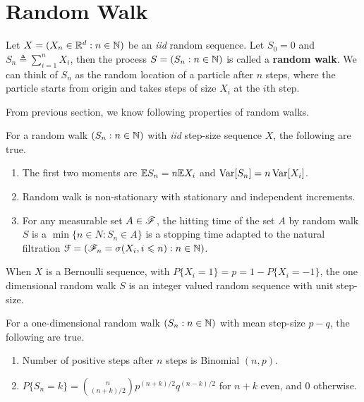 \documentclass[a4paper,10pt,english]{article}
\begin{document}
\section{Random Walk}
Let $X = (X_n \in \mathbb{R}^d: n \in \mathbb{N})$ be an \emph{iid} random sequence. 
Let $S_0 = 0$ and $S_n \triangleq \sum_{i=1}^nX_i$, then the process $S = (S_n: n \in \mathbb{N})$ is called a \textbf{random walk}. 
We can think of $S_n$ as the random location of a particle after $n$ steps, 
where the particle starts from origin and takes steps of size $X_i$ at the $i$th step. 

From previous section, we know following properties of random walks. 
\begin{thm} 
For a random walk $(S_n: n \in \mathbb{N})$ with \emph{iid} step-size sequence $X$, the following are true. 
\begin{enumerate}[i\_]
\item The first two moments are $\mathbb{E} S_n = n\mathbb{E} X_i$ and $\operatorname{Var}[S_n] = n\operatorname{Var}[X_i]$. 
\item Random walk is non-stationary with stationary and independent increments. 
\item For any measurable set $A \in \mathscr{F}$, the hitting time of the set $A$ by random walk $S$ is a $\min\{n \in N: S_n \in A\}$ is a stopping time adapted to the natural filtration $\mathcal{F} = (\mathscr{F}_n = \sigma(X_i, i \leqslant n): n \in \mathbb{N})$.
\end{enumerate}
\end{thm}

When $X$ is a Bernoulli sequence, with $P\{X_i = 1\} = p = 1 - P\{X_i = -1\}$, 
the one dimensional random walk $S$ is an integer valued random sequence with unit step-size. 
\begin{thm} 
For a one-dimensional random walk $(S_n: n \in \mathbb{N})$ with mean step-size $p-q$, the following are true. 
\begin{enumerate}[i\_]
\item Number of positive steps after $n$ steps is Binomial $(n,p)$. 
\item $P\{S_n = k\} = \binom{n}{(n+k)/2}p^{(n+k)/2}q^{(n-k)/2}$ for $n+k$ even, and $0$ otherwise. 
\end{enumerate}
\end{thm}
\end{document}
